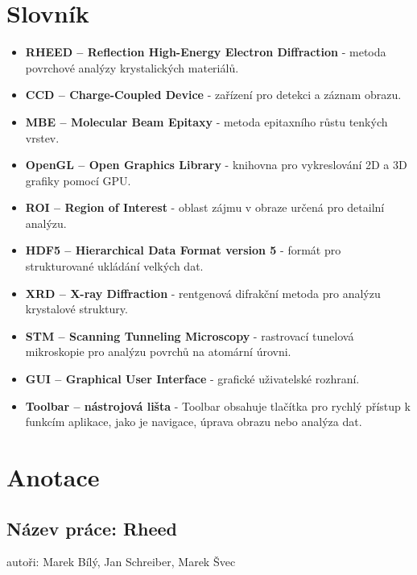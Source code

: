 \documentclass{article}
\begin{document}
\newpage
{}
\pagestyle{fancy}

\tableofcontents
\newpage


\section{Slovník}
\begin{itemize}
\item \textbf{RHEED – Reflection High-Energy Electron Diffraction} - metoda povrchové analýzy krystalických materiálů.\\
\item \textbf{CCD – Charge-Coupled Device} - zařízení pro detekci a záznam obrazu.\\
\item \textbf{MBE – Molecular Beam Epitaxy} - metoda epitaxního růstu tenkých vrstev.\\
\item \textbf{OpenGL – Open Graphics Library} - knihovna pro vykreslování 2D a 3D grafiky pomocí GPU.\\
\item \textbf{ROI – Region of Interest} - oblast zájmu v obraze určená pro detailní analýzu.\\
\item \textbf{HDF5 – Hierarchical Data Format version 5} - formát pro strukturované ukládání velkých dat.\\
\item \textbf{XRD – X-ray Diffraction} - rentgenová difrakční metoda pro analýzu krystalové struktury.\\
\item \textbf{STM – Scanning Tunneling Microscopy} - rastrovací tunelová mikroskopie pro analýzu povrchů na atomární úrovni.\\
\item \textbf{GUI – Graphical User Interface} - grafické uživatelské rozhraní.\\
\item \textbf{Toolbar – nástrojová lišta} - Toolbar obsahuje tlačítka pro rychlý přístup k funkcím aplikace, jako je navigace, úprava obrazu nebo analýza dat.
\end{itemize}
\newpage

\section*{Anotace}

\subsection*{Název práce: Rheed}
autoři: Marek Bílý, Jan Schreiber, Marek Švec
\vspace{0.5cm}
\end{document}

